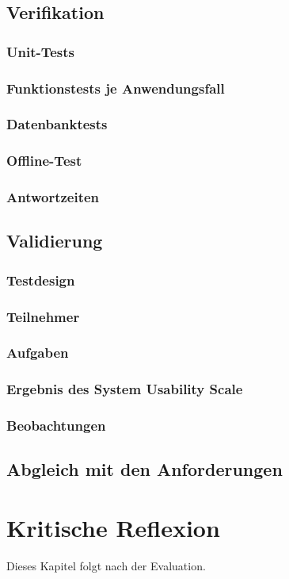 \documentclass[12pt,a4paper]{scrreprt}
\begin{document}
\section{Verifikation}
\subsection{Unit-Tests}
\subsection{Funktionstests je Anwendungsfall}
\subsection{Datenbanktests}
\subsection{Offline-Test}
\subsection{Antwortzeiten}
\section{Validierung}
\subsection{Testdesign}
\subsection{Teilnehmer}
\subsection{Aufgaben}
\subsection{Ergebnis des System Usability Scale}
\subsection{Beobachtungen}
\section{Abgleich mit den Anforderungen}

\chapter{Kritische Reflexion}
Dieses Kapitel folgt nach der Evaluation.
\end{document}
